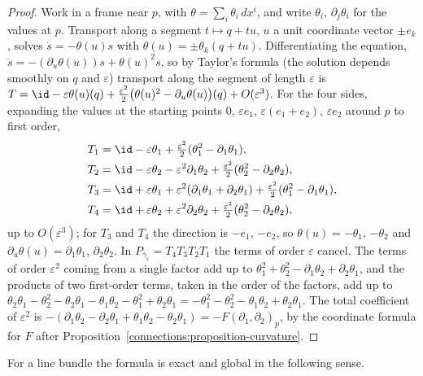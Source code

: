 \begin{proof}
Work in a frame near $p$, with $\theta = \sum_i\theta_i\,dx^i$, and write $\theta_i$, $\partial_j\theta_i$ for the values at $p$. Transport along a segment $t \mapsto q + tu$, $u$ a unit
coordinate vector $\pm e_k$, solves $\dot s = -\theta(u)s$ with $\theta(u) = \pm\theta_k(q + tu)$. Differentiating the equation, $\ddot s = -(\partial_u\theta(u))s + \theta(u)^2s$, so by
Taylor's formula (the solution depends smoothly on $q$ and $\varepsilon$) transport along the segment of length $\varepsilon$ is
$T = \id - \varepsilon\theta(u)(q) + \frac{\varepsilon^2}2\bigl(\theta(u)^2 - \partial_u\theta(u)\bigr)(q) + O(\varepsilon^3)$. For the four sides, expanding the values at the starting
points $0$, $\varepsilon e_1$, $\varepsilon(e_1 + e_2)$, $\varepsilon e_2$ around $p$ to first order,
\[
\begin{aligned}
T_1 &= \id - \varepsilon\theta_1 + \tfrac{\varepsilon^2}2(\theta_1^2 - \partial_1\theta_1),\\
T_2 &= \id - \varepsilon\theta_2 - \varepsilon^2\partial_1\theta_2 + \tfrac{\varepsilon^2}2(\theta_2^2 - \partial_2\theta_2),\\
T_3 &= \id + \varepsilon\theta_1 + \varepsilon^2(\partial_1\theta_1 + \partial_2\theta_1) + \tfrac{\varepsilon^2}2(\theta_1^2 - \partial_1\theta_1),\\
T_4 &= \id + \varepsilon\theta_2 + \varepsilon^2\partial_2\theta_2 + \tfrac{\varepsilon^2}2(\theta_2^2 - \partial_2\theta_2),
\end{aligned}
\]
up to $O(\varepsilon^3)$; for $T_3$ and $T_4$ the direction is $-e_1$, $-e_2$, so $\theta(u) = -\theta_1$, $-\theta_2$ and $\partial_u\theta(u) = \partial_1\theta_1$, $\partial_2\theta_2$. In
$P_{\gamma_\varepsilon} = T_4T_3T_2T_1$ the terms of order $\varepsilon$ cancel. The terms of order $\varepsilon^2$ coming from a single factor add up to
$\theta_1^2 + \theta_2^2 - \partial_1\theta_2 + \partial_2\theta_1$, and the products of two first-order terms, taken in the order of the factors, add up to
$\theta_2\theta_1 - \theta_2^2 - \theta_2\theta_1 - \theta_1\theta_2 - \theta_1^2 + \theta_2\theta_1 = -\theta_1^2 - \theta_2^2 - \theta_1\theta_2 + \theta_2\theta_1$. The total coefficient
of $\varepsilon^2$ is $-(\partial_1\theta_2 - \partial_2\theta_1 + \theta_1\theta_2 - \theta_2\theta_1) = -F(\partial_1, \partial_2)_p$, by the coordinate formula for $F$ after
Proposition~\ref{connections:proposition-curvature}.
\end{proof}

For a line bundle the formula is exact and global in the following sense.

